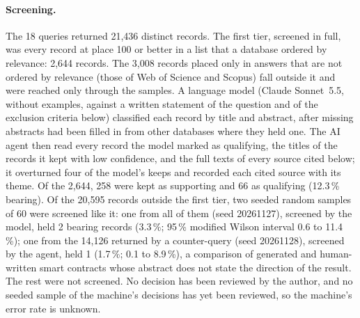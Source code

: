 \paragraph{Screening.}
The 18 queries returned 21,436 distinct records.
The first tier, screened in full, was every record at place 100 or better
in a list that a database ordered by relevance: 2,644 records.
The 3,008 records placed only in answers that are not ordered by relevance
(those of Web of Science and Scopus) fall outside it and were reached only
through the samples.
A language model (Claude Sonnet~5.5, without examples, against a written
statement of the question and of the exclusion criteria below) classified
each record by title and abstract, after missing abstracts had been filled
in from other databases where they held one.
The AI agent then read every record the model marked as qualifying, the
titles of the records it kept with low confidence, and the full texts of
every source cited below; it overturned four of the model's keeps and
recorded each cited source with its theme.
Of the 2,644, 258 were kept as supporting and 66 as qualifying (12.3\,\%
bearing).
Of the 20,595 records outside the first tier, two seeded random samples of
60 were screened like it: one from all of them (seed 20261127), screened by
the model, held 2 bearing records (3.3\,\%; 95\,\% modified Wilson interval
0.6 to 11.4\,\%); one from the 14,126 returned by a counter-query (seed
20261128), screened by the agent, held 1 (1.7\,\%; 0.1 to 8.9\,\%), a
comparison of generated and human-written smart contracts whose abstract
does not state the direction of the result.
The rest were not screened.
No decision has been reviewed by the author, and no seeded sample of the
machine's decisions has yet been reviewed, so the machine's error rate is
unknown.

